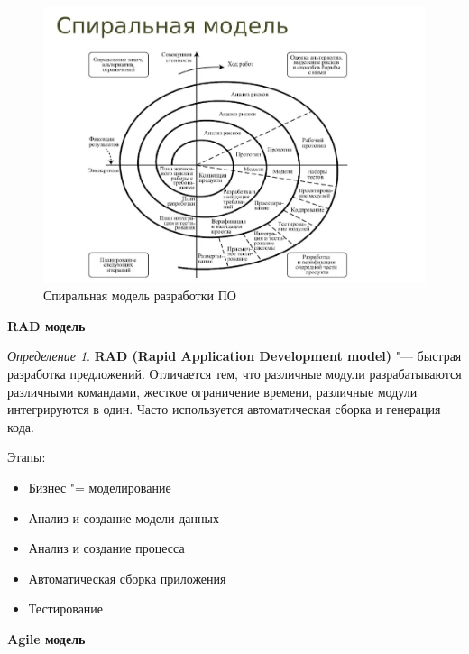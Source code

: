 \documentclass[bachelor, och, pract]{SCWorks}
\theoremstyle{remark}
\newtheorem{definition}{Определение}
\begin{document}
    \begin{figure}[H]
        \begin{center}
            \includegraphics[scale=0.6]{res/spiral-model.png}
            \caption{Спиральная модель разработки ПО}
        \end{center}
    \end{figure}

    \begin{center}
        \textbf{RAD модель}    
    \end{center}
    
    \begin{definition}
        \textbf{RAD (Rapid Application Development model)} "--- быстрая разработка предложений. Отличается тем, что различные модули разрабатываются различными командами, жесткое ограничение времени, различные модули интегрируются в один. Часто используется автоматическая сборка и генерация кода.
    \end{definition}

    Этапы:

    \begin{itemize}[label=$\bullet$]
        \item Бизнес "= моделирование
        \item Анализ и создание модели данных
        \item Анализ и создание процесса
        \item Автоматическая сборка приложения
        \item Тестирование
    \end{itemize}


    \begin{center}
        \textbf{Agile модель}    
    \end{center}
\end{document}
